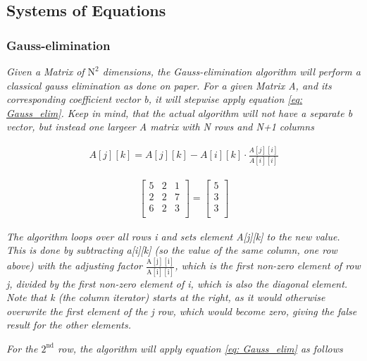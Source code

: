 \subsection{Systems of Equations}

\subsubsection{Gauss-elimination}

\textit{Given a Matrix of $\mathrm{N^2}$ dimensions, the Gauss-elimination algorithm will perform a classical gauss elimination as done on paper. For a given Matrix A, and its corresponding coefficient vector b, it will stepwise apply equation \ref{eq: Gauss_elim}. Keep in mind, that the actual algorithm will not have a separate b vector, but instead one largeer A matrix with N rows and N+1 columns}

\begin{align}
    A[j][k] = A[j][k] - A[i][k] \cdot \frac{A[j][i]}{A[i][i]}
    \label{eq: Gauss_elim}
\end{align}

\begin{align*}
    \begin{bmatrix}
        5 & 2 & 1 \\
        2 & 2 & 7 \\
        6 & 2 & 3 \\
    \end{bmatrix}
    =
    \begin{bmatrix}
        5 \\
        3 \\
        3 \\
    \end{bmatrix}
\end{align*}

\textit{The algorithm loops over all rows i and sets element A[j][k] to the new value. This is done by subtracting a[i][k] (so the value of the same column, one row above) with the adjusting factor $\mathrm{\frac{A[j][i]}{A[i][i]}}$, which is the first non-zero element of row j, divided by the first non-zero element of i, which is also the diagonal element. Note that k (the column iterator) starts at the right, as it would otherwise overwrite the first element of the j row, which would become zero, giving the false result for the other elements.}

\textit{For the $\mathrm{2^{nd}}$ row, the algorithm will apply equation \ref{eq: Gauss_elim} as follows}

